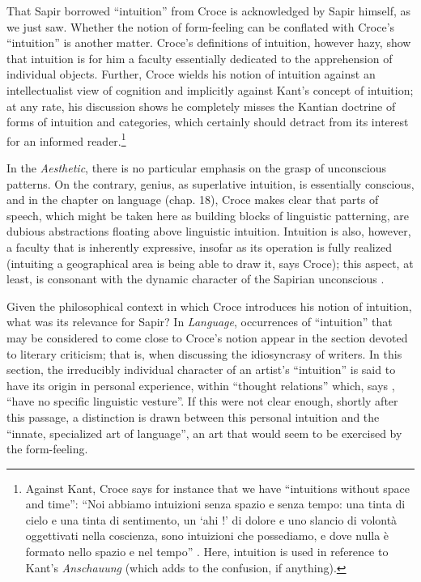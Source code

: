 \documentclass[output=paper]{langscibook}
\begin{document}
That Sapir borrowed ``intuition'' from Croce is acknowledged by Sapir himself, as we just saw. Whether the notion of form-feeling can be conflated with Croce's ``intuition'' is another matter. Croce's definitions of intuition, however hazy, show that intuition is for him a faculty essentially dedicated to the apprehension of individual objects. Further, Croce wields his notion of intuition against an intellectualist view of cognition and implicitly against Kant's concept of intuition; at any rate, his discussion shows he completely misses the Kantian doctrine of forms of intuition and categories, which certainly should detract from its interest for an informed reader.\footnote{Against Kant, Croce says for instance that we have ``intuitions without space and time'': ``Noi abbiamo intuizioni senza spazio e senza tempo: una tinta di cielo e una tinta di sentimento, un `ahi !' di dolore e uno slancio di volontà oggettivati nella coscienza, sono intuizioni che possediamo, e dove nulla è formato nello spazio e nel tempo'' \citep[6--7]{Croce1908}. Here, intuition is used in reference to Kant's \emph{Anschauung} (which adds to the confusion, if anything).}

In the \emph{Aesthetic}, there is no particular emphasis on the grasp of unconscious patterns. On the contrary, genius, as superlative intuition, is essentially conscious, and in the chapter on language (chap. 18), Croce makes clear that parts of speech, which might be taken here as building blocks of linguistic patterning, are dubious abstractions floating above linguistic intuition. Intuition is also, however, a faculty that is inherently expressive, insofar as its operation is fully realized (intuiting a geographical area is being able to draw it, says Croce); this aspect, at least, is consonant with the dynamic character of the Sapirian unconscious \citep[see][]{Allen1986}.

Given the philosophical context in which Croce introduces his notion of intuition, what was its relevance for Sapir? In \emph{Language}, occurrences of ``intuition'' that may be considered to come close to Croce's notion appear in the section devoted to  literary criticism; that is, when discussing the idiosyncrasy of writers. In this section, the irreducibly individual character of an artist's ``intuition'' is said to have its origin in personal experience, within ``thought relations'' which, says \citet[239]{Sapir1921}, ``have no specific linguistic vesture''. If this were not clear enough, shortly after this passage, a distinction is drawn between this personal intuition and the ``innate, specialized art of language'', an art that would seem to be exercised by the form-feeling.
\end{document}
